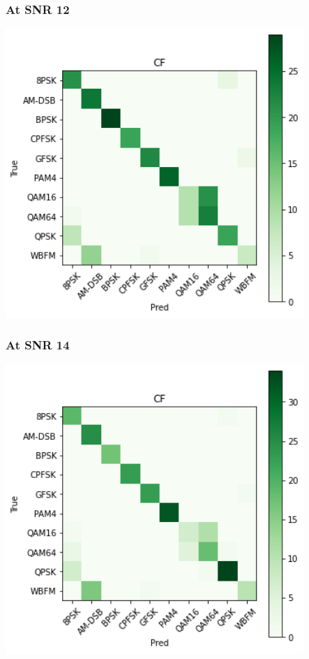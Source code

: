 \documentclass[12pt,a4paper]{article}
\begin{document}
\subsubsection{At SNR 12}
\begin{center}
\includegraphics[width=320pt]{imgs/snrs/snr12.png}
\end{center}
\subsubsection{At SNR 14}
\begin{center}
\includegraphics[width=320pt]{imgs/snrs/snr13.png}
\end{center}
\end{document}

